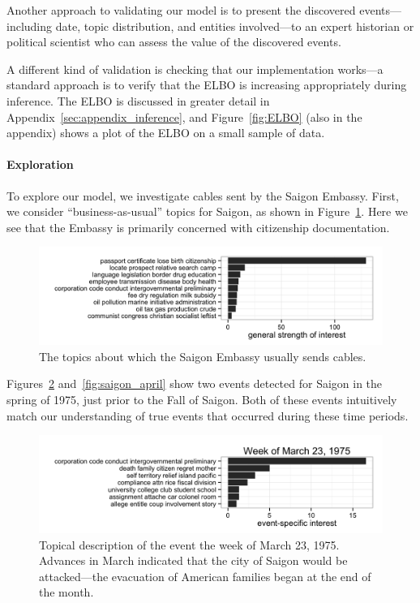 Another approach to validating our model is to present the discovered events---including date, topic distribution, and entities involved---to an expert historian or political scientist who can assess the value of the discovered events.

A different kind of validation is checking that our implementation works---a standard approach is to verify that the ELBO is increasing appropriately during inference.  The ELBO is discussed in greater detail in Appendix~\ref{sec:appendix_inference}, and Figure~\ref{fig:ELBO} (also in the appendix) shows a plot of the ELBO on a small sample of data.

\paragraph{Exploration} To explore our model, we investigate cables sent by the Saigon Embassy.  First, we consider ``business-as-usual'' topics for Saigon, as shown in Figure~\ref{fig:saigon_entity}.  Here we see that the Embassy is primarily concerned with citizenship documentation.

\begin{figure}[ht]
\centering
\includegraphics[width=\textwidth]{fig/saigon_topics.png}
\caption{The topics about which the Saigon Embassy usually sends cables.}
\label{fig:saigon_entity}
\end{figure}

Figures~\ref{fig:saigon_march} and~\ref{fig:saigon_april} show two events detected for Saigon in the spring of 1975, just prior to the Fall of Saigon.  Both of these events intuitively match our understanding of true events that occurred during these time periods.

\begin{figure}[ht]
\centering
\includegraphics[width=\textwidth]{fig/saigon_march23.png}
\caption{Topical description of the event the week of March 23, 1975.  Advances in March indicated that the city of Saigon would be attacked---the evacuation of American families began at the end of the month.}
\label{fig:saigon_march}
\end{figure}

